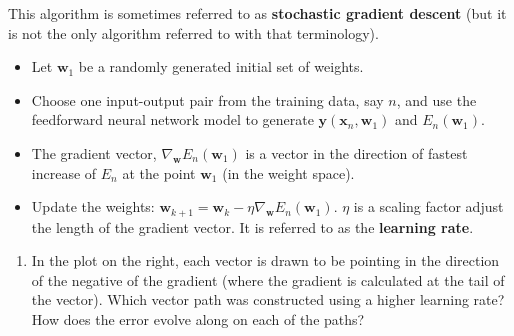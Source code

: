 \documentclass[12pt,letterpaper,noanswers]{exam}
\newcommand{\vc}[1]{\boldsymbol{#1}}
\newcommand{\note}[1]{{#1}} %
\begin{document}
\note{
\begin{tcolorbox}
This algorithm is sometimes referred to as \textbf{stochastic gradient descent} (but it is not the only algorithm referred to with that terminology).
\begin{itemize}
\itemsep0pt
    \item Let $\vc{w}_1$ be a randomly generated initial set of weights.
    \item Choose one input-output pair from the training data, say $n$, and use the feedforward neural network model to generate $\vc{y}(\vc{x}_n,\vc{w}_1)$ and $E_ n(\vc{w}_1)$.
\item The gradient vector, $\nabla_{\vc{w}}E_n(\vc{w}_1)$ is a vector in the direction of fastest increase of $E_n$ at the point $\vc{w}_1$ (in the weight space). 
\item Update the weights: $\vc{w}_{k+1} = \vc{w}_k - \eta\nabla_{\vc{w}}E_n(\vc{w}_1)$.  $\eta$ is a scaling factor adjust the length of the gradient vector.  It is referred to as the \textbf{learning rate}.
\end{itemize}
\end{tcolorbox}
}


\begin{enumerate}[resume=classQ]
 \item In the plot on the right, each vector is drawn to be pointing in the direction of the negative of the gradient (where the gradient is calculated at the tail of the vector).  Which vector path was constructed using a higher learning rate?  How does the error evolve along on each of the paths?
\end{enumerate}



\vfill



\end{document}
